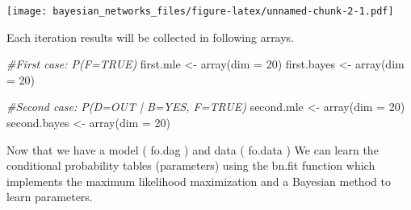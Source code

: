 \documentclass[
]{article}
\newenvironment{Shaded}{\begin{snugshade}}{\end{snugshade}}
\newcommand{\AttributeTok}[1]{\textcolor[rgb]{0.77,0.63,0.00}{#1}}
\newcommand{\CommentTok}[1]{\textcolor[rgb]{0.56,0.35,0.01}{\textit{#1}}}
\newcommand{\DecValTok}[1]{\textcolor[rgb]{0.00,0.00,0.81}{#1}}
\newcommand{\FunctionTok}[1]{\textcolor[rgb]{0.00,0.00,0.00}{#1}}
\newcommand{\NormalTok}[1]{#1}
\newcommand{\OtherTok}[1]{\textcolor[rgb]{0.56,0.35,0.01}{#1}}
\begin{document}
\texttt{[image: bayesian\_networks\_files/figure-latex/unnamed-chunk-2-1.pdf]}

Each iteration results will be collected in following arrays.

\begin{Shaded}
\begin{Highlighting}[]
\CommentTok{\#First case: P(F=TRUE) }
\NormalTok{first.mle }\OtherTok{\textless{}{-}} \FunctionTok{array}\NormalTok{(}\AttributeTok{dim =} \DecValTok{20}\NormalTok{)}
\NormalTok{first.bayes }\OtherTok{\textless{}{-}} \FunctionTok{array}\NormalTok{(}\AttributeTok{dim =} \DecValTok{20}\NormalTok{)}

\CommentTok{\#Second case: P(D=OUT | B=YES, F=TRUE)}
\NormalTok{second.mle }\OtherTok{\textless{}{-}} \FunctionTok{array}\NormalTok{(}\AttributeTok{dim =} \DecValTok{20}\NormalTok{)}
\NormalTok{second.bayes }\OtherTok{\textless{}{-}} \FunctionTok{array}\NormalTok{(}\AttributeTok{dim =} \DecValTok{20}\NormalTok{)}
\end{Highlighting}
\end{Shaded}

Now that we have a model ( fo.dag ) and data ( fo.data )
We can learn the conditional probability tables (parameters) using the bn.fit function which implements the maximum likelihood maximization and a Bayesian method to learn parameters.
\end{document}
